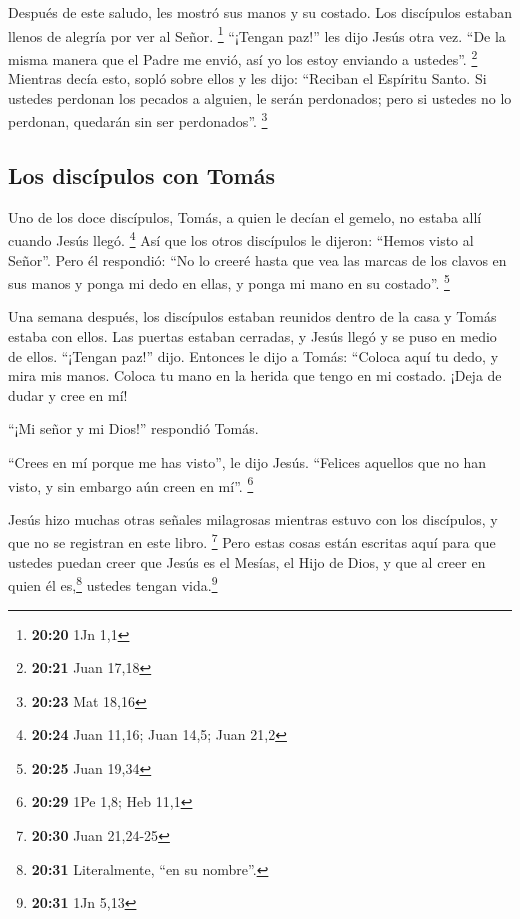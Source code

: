  Después de este saludo, les mostró sus manos y su
costado. Los discípulos estaban llenos de alegría por ver al Señor.
\footnote{\textbf{20:20} 1Jn 1,1}  ``¡Tengan paz!'' les
dijo Jesús otra vez. ``De la misma manera que el Padre me envió, así yo
los estoy enviando a ustedes''. \footnote{\textbf{20:21} Juan 17,18}
 Mientras decía esto, sopló sobre ellos y les dijo:
``Reciban el Espíritu Santo.  Si ustedes perdonan los
pecados a alguien, le serán perdonados; pero si ustedes no lo perdonan,
quedarán sin ser perdonados''. \footnote{\textbf{20:23} Mat 18,16}

\hypertarget{los-discuxedpulos-con-tomuxe1s}{%
\subsection{Los discípulos con
Tomás}\label{los-discuxedpulos-con-tomuxe1s}}

 Uno de los doce discípulos, Tomás, a quien le decían el
gemelo, no estaba allí cuando Jesús llegó. \footnote{\textbf{20:24} Juan
  11,16; Juan 14,5; Juan 21,2}  Así que los otros
discípulos le dijeron: ``Hemos visto al Señor''. Pero él respondió: ``No
lo creeré hasta que vea las marcas de los clavos en sus manos y ponga mi
dedo en ellas, y ponga mi mano en su costado''. \footnote{\textbf{20:25}
  Juan 19,34}

 Una semana después, los discípulos estaban reunidos
dentro de la casa y Tomás estaba con ellos. Las puertas estaban
cerradas, y Jesús llegó y se puso en medio de ellos. ``¡Tengan paz!''
dijo.  Entonces le dijo a Tomás: ``Coloca aquí tu dedo, y
mira mis manos. Coloca tu mano en la herida que tengo en mi costado.
¡Deja de dudar y cree en mí!

 ``¡Mi señor y mi Dios!'' respondió Tomás.

 ``Crees en mí porque me has visto'', le dijo Jesús.
``Felices aquellos que no han visto, y sin embargo aún creen en mí''.
\footnote{\textbf{20:29} 1Pe 1,8; Heb 11,1}

 Jesús hizo muchas otras señales milagrosas mientras
estuvo con los discípulos, y que no se registran en este libro.
\footnote{\textbf{20:30} Juan 21,24-25}  Pero estas cosas
están escritas aquí para que ustedes puedan creer que Jesús es el
Mesías, el Hijo de Dios, y que al creer en quien él es,\footnote{\textbf{20:31}
  Literalmente, ``en su nombre''.} ustedes tengan vida.\footnote{\textbf{20:31}
  1Jn 5,13}

